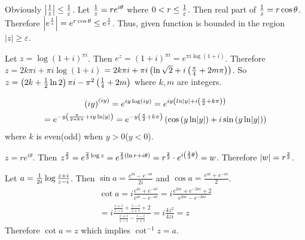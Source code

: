 \begin{problem}
	Obviously $\left | {1 \over z } \right | \leq {1\over \varepsilon} $. Let $ {1 \over z } = r e^{i\theta} $ where $0 < r \leq {1 \over \varepsilon}$. Then real part of ${1\over z} = r \cos\theta$. Therefore $\left | e^{1 \over z} \right | = e^{r\cos \theta} \leq e^{1 \over \varepsilon}$. Thus, given function is bounded in the region $\left | z  \right | \geq \varepsilon $.
\end{problem}

\begin{problem}
	Let $z = \log\left( 1 + i  \right) ^{\pi i}$. Then $e^{z} = \left( 1 + i  \right) ^{\pi i} = e^{\pi i \log \left( 1 + i \right)}$. Therefore $z = 2k\pi i + \pi i \log \left ( 1 + i \right)$ $ = 2k \pi i + \pi i \left(  \ln \sqrt{2} + i \left(  {\pi\over 4} + 2m \pi  \right) \right)$. So $z = \left( 2k + {1 \over 2 }\ln{2} \right)\pi i - \pi ^{2}\left( {1 \over 4} + 2m \right)$ where $k, m$ are integers.
\end{problem}

\begin{problem}
	\begin{multline*}
	\left( iy  \right)^{\left( iy \right)}
	= e^{iy \log \left( iy \right)}
	= e^{iy \left(  ln \lvert y \rvert + i\left( {\pi \over 2} + k\pi  \right) \right)}\\
	= e^{-y \left( { \pi \over 2 + k\pi } + iy\ln \lvert y \rvert  \right)}
	= e^{-y\left( {\pi \over 2 } + k\pi  \right)} \left(  \cos\left( y\ln \lvert y \rvert  \right) + i\sin \left( y\ln \lvert y \rvert  \right) \right)
	\end{multline*}
where $k$ is even(odd) when $y>0$($y<0$).
\end{problem}

\begin{problem}
	$z = re^{i \theta } $.
	Then $z^{2\over 3} = e^{ {2 \over 3} \log z  } = e^{ {2 \over 3 } \left( \ln r + i \theta  \right)} = r^{2\over 3}\cdot e^{i \left( {2 \over 3 } \theta  \right)} = w$.
	Therefore $\left | w  \right | = r^{2\over 3}$.
\end{problem}

\begin{problem}
	Let $a = {1 \over 2i } \log \frac{z+i}{z-i}$. Then $\sin a = \frac{e^{ai} - e^{-ai}}{2i}$ and $\cos a = \frac{e^{ai}+e^{-ai}}{2}$. 
\begin{multline*}
	\cot a = i \frac{e^{ai}+e^{-ai}}{e^{ai}-e^{-ai}} = i \frac{e^{2ai}+e^{-2ai}+2}{e^{2ai}-e^{-2ai}} \\
	=i \frac{ \frac{ z+i }{z-i} + \frac{z-i}{z+i} + 2 }{\frac{z+i}{z-i} - \frac{z-i}{z+i}} = i \frac{4z^{2}}{4zi} = z
\end{multline*}
Therefore $\cot a = z$ which implies $\cot^{-1 } z = a$.
\end{problem}

